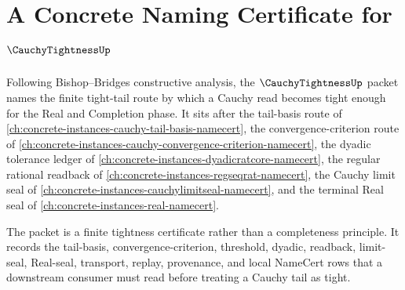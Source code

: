 \chapter{A Concrete Naming Certificate for $\CauchyTightnessUp$}
\label{ch:concrete-instances-cauchy-tightness-namecert}

Following Bishop--Bridges constructive analysis, the $\CauchyTightnessUp$ packet names the finite tight-tail route by which a Cauchy read becomes tight enough for the Real and Completion phase. It sits after the tail-basis route of \autoref{ch:concrete-instances-cauchy-tail-basis-namecert}, the convergence-criterion route of \autoref{ch:concrete-instances-cauchy-convergence-criterion-namecert}, the dyadic tolerance ledger of \autoref{ch:concrete-instances-dyadicratcore-namecert}, the regular rational readback of \autoref{ch:concrete-instances-regseqrat-namecert}, the Cauchy limit seal of \autoref{ch:concrete-instances-cauchylimitseal-namecert}, and the terminal Real seal of \autoref{ch:concrete-instances-real-namecert}.

The packet is a finite tightness certificate rather than a completeness principle. It records the tail-basis, convergence-criterion, threshold, dyadic, readback, limit-seal, Real-seal, transport, replay, provenance, and local NameCert rows that a downstream consumer must read before treating a Cauchy tail as tight.

